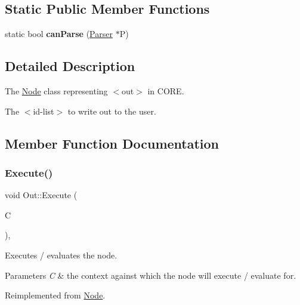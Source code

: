\subsection*{Static Public Member Functions}
\begin{DoxyCompactItemize}
\item 
\mbox{\label{class_out_af2855dea81d0cd7c800af27f6ce371f1}} 
static bool {\bfseries can\+Parse} (\mbox{\hyperlink{class_parser}{Parser}} $\ast$P)
\end{DoxyCompactItemize}


\subsection{Detailed Description}
The \mbox{\hyperlink{class_node}{Node}} class representing {\ttfamily $<$out$>$} in C\+O\+RE. 

The $<$id-\/list$>$ to write out to the user. 

\subsection{Member Function Documentation}
\mbox{\label{class_out_a4ffa25656789ae40127a2f06d6e36207}} 
\subsubsection{\texorpdfstring{Execute()}{Execute()}}
{\footnotesize\ttfamily void Out\+::\+Execute (\begin{DoxyParamCaption}\item[{\mbox{\hyperlink{class_a_s_t_context}{A\+S\+T\+Context}} \&}]{C }\end{DoxyParamCaption})\hspace{0.3cm}{\ttfamily [override]}, {\ttfamily [virtual]}}

Executes / evaluates the node. 
\begin{DoxyParams}{Parameters}
{\em C} & the context against which the node will execute / evaluate for. \\
\hline
\end{DoxyParams}


Reimplemented from \mbox{\hyperlink{class_node_a27ad1ba81d2596817b361368282bcbfa}{Node}}.

\mbox{\label{class_out_a3aefc50458c5e3f05e3e7419c93c8eb5}} 
